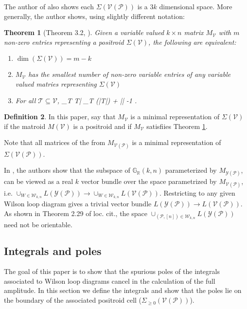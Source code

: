 \documentclass[11pt]{article}
\newcommand{\R}{\mathbb{R}}
\newcommand{\Grall}{\mathbb{G}_{\R}}
\def\bas #1\eas{\begin{align*} #1 \end{align*}}
\newcommand{\cP}{\mathcal{P}}
\newcommand{\cV}{\mathcal{V}}
\newcommand{\cY}{\mathcal{Y}}
\newcommand{\VP}{\cV(\cP)}
\newcommand{\YP}{\cY(\cP)}
\newcommand{\Sigmapos}{\Sigma_{\geq 0}}
\newcommand{\cW}{\mathcal{W}}
\newtheorem{thm}{Theorem}[section]
\theoremstyle{remark}
\theoremstyle{definition}
\newtheorem{dfn}[thm]{Definition}
\begin{document}
The author of \cite{basisshapeloci} also shows each $\Sigma(\VP)$ is a $3k$ dimensional space. More generally, the author shows, using slightly different notation:

\begin{thm}[Theorem 3.2, \cite{basisshapeloci}]\label{res:minimalrep}
Given a variable valued $k \times n$ matrix $M_\cV$ with $m$ non-zero entries representing a positroid  $\Sigma(\cV)$, the following are equivalent:
\begin{enumerate}
\item $\dim(\Sigma(\cV)) = m -k$ 
\item $M_\cV$ has the smallest number of non-zero variable entries of any variable valued matries representing $\Sigma(\cV)$
\item For all $\mathcal{T} \subseteq \cV$, \bas |\bigcup_{T \in {}}T| \geq \max_{T \in  {}} (|T|) + || -1 \;. \eas
\end{enumerate}
\end{thm}

\begin{dfn}
In this paper, say that $M_{\cV}$ is a minimal representation of $\Sigma(\cV)$ if the matroid $M(\cV)$ is a positroid and if $M_{\cV}$ satisfiies Theorem \ref{res:minimalrep}.
\end{dfn}

Note that all matrices of the from $M_{\VP}$ is a minimal representation of $\Sigma(\VP)$. 

In \cite[section 2.3]{non-orientable}, the authors show that  the subspace of $\Grall(k,n)$ parameterized by $M_{\YP}$, can be viewed as a real $k$ vector bundle over the space parametrized by $M_{\VP}$, i.e.  $\cup_{W \in \cW_{k,n}}L(\YP) \rightarrow \cup_{W \in \cW_{k,n}}L(\VP)$. Restricting to any given Wilson loop diagram gives a trivial vector bundle $L(\YP) \rightarrow L(\VP)$. As shown in Theorem 2.29 of loc. cit., the space $\cup_{(\cP, [n]) \in \cW_{k,n}}L(\YP)$ need not be orientable. 


\subsection{Integrals and poles \label{sec:integrals}}

The goal of this paper is to show that the spurious poles of the integrals associated to Wilson loop diagrams cancel in the calculation of the full amplitude. In this section we define the integrals and show that the poles lie on the boundary of the associated positroid cell ($\Sigmapos(\VP)$).
\end{document}
